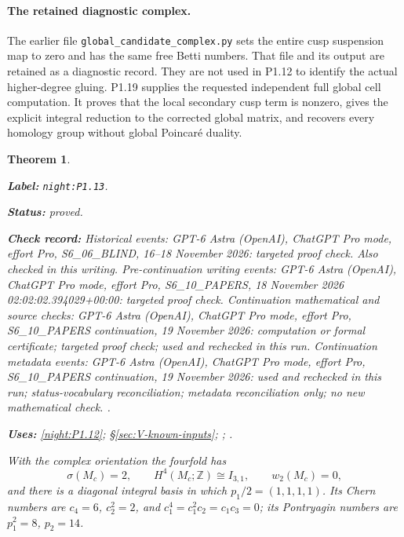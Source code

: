 \documentclass[11pt,a4paper]{article}
\newtheorem{theorem}{Theorem}[section]
\theoremstyle{definition}
\newcommand{\StatementRecord}[4]{\par\smallskip\begingroup\upshape\raggedright\noindent\textbf{Label:} \nolinkurl{#1}.\par\noindent\textbf{Status:} #2.\par\noindent\textbf{Check record:} #3.\par\noindent\textbf{Uses:} #4.\par\endgroup\smallskip}
\begin{document}
\paragraph{The retained diagnostic complex.}
The earlier file \texttt{global\_candidate\_complex.py} sets the entire
cusp suspension map to zero and has the same free Betti numbers.
That file and its output are retained as a diagnostic record.  They
are not used in P1.12 to identify the actual higher-degree gluing.
P1.19 supplies the requested independent full global cell computation.
It proves that the local secondary cusp term is nonzero, gives the
explicit integral reduction to the corrected global matrix, and
recovers every homology group without global Poincar\'e duality.

\begin{theorem}\label{night:P1.13}
\StatementRecord{night:P1.13}{proved}{Historical events: GPT-6 Astra (OpenAI), ChatGPT Pro mode, effort Pro, S6\_06\_BLIND, 16--18 November 2026: targeted proof check. Also checked in this writing. Pre-continuation writing events: GPT-6 Astra (OpenAI), ChatGPT Pro mode, effort Pro, S6\_10\_PAPERS, 18 November 2026 02:02:02.394029+00:00: targeted proof check. Continuation mathematical and source checks: GPT-6 Astra (OpenAI), ChatGPT Pro mode, effort Pro, S6\_10\_PAPERS continuation, 19 November 2026: computation or formal certificate; targeted proof check; used and rechecked in this run. Continuation metadata events: GPT-6 Astra (OpenAI), ChatGPT Pro mode, effort Pro, S6\_10\_PAPERS continuation, 19 November 2026: used and rechecked in this run; status-vocabulary reconciliation; metadata reconciliation only; no new mathematical check. }{\cref{night:P1.12}; \S\ref{sec:V-known-inputs}; \cite[equations (1.2)--(1.4), pp.~3--4]{ffEsoleKang}; \cite[Theorem 2.2.1, p.~61]{ffPetersSterk}}
With the complex orientation the fourfold has
\[
\sigma(M_c)=2,\qquad H^4(M_c;\mathbb Z)\cong I_{3,1},\qquad
w_2(M_c)=0,
\]
and there is a diagonal integral basis in which
$p_1/2=(1,1,1,1)$.
Its Chern numbers are
$c_4=6$, $c_2^2=2$, and
$c_1^4=c_1^2c_2=c_1c_3=0$; its Pontryagin numbers are
$p_1^2=8$, $p_2=14$.
\end{theorem}
\end{document}
